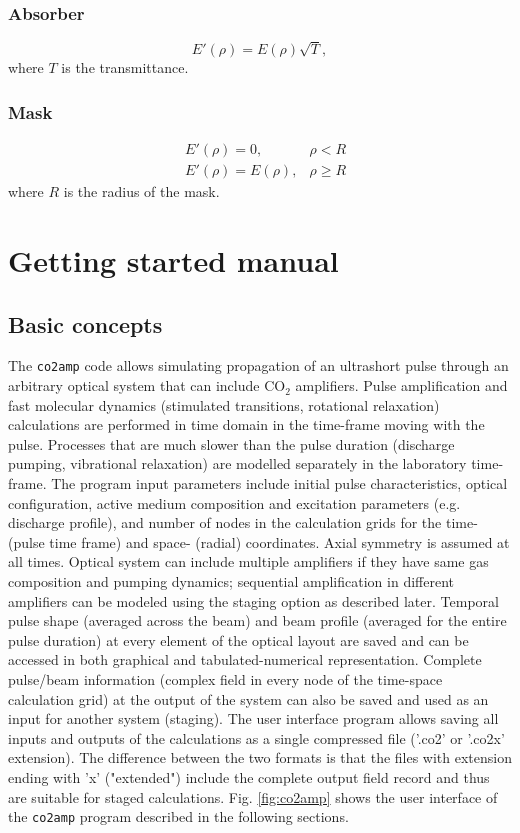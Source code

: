 \documentclass{report}
\begin{document}
\subsection{Absorber}
\begin{equation}
E'(\rho) = E(\rho) \sqrt{T},
\end{equation}
where $T$ is the transmittance.

\subsection{Mask}
\begin{align}
&E'(\rho) = 0, &\rho < R\\
&E'(\rho) = E(\rho), &\rho \geq R
\end{align}
where $R$ is the radius of the mask.


\chapter{Getting started manual}


\section{Basic concepts}
The \texttt{co2amp} code allows simulating propagation of an ultrashort pulse through an arbitrary optical system that can include CO$_2$ amplifiers. Pulse amplification and fast molecular dynamics (stimulated transitions, rotational relaxation) calculations are performed in time domain in the time-frame moving with the pulse. Processes that are much slower than the pulse duration (discharge pumping, vibrational relaxation) are modelled separately in the laboratory time-frame.
The program input parameters include initial pulse characteristics, optical configuration, active medium composition and excitation parameters (e.g. discharge profile), and number of nodes in the calculation grids for the time- (pulse time frame) and space- (radial) coordinates. Axial symmetry is assumed at all times. Optical system can include multiple amplifiers if they have same gas composition and pumping dynamics; sequential amplification in different amplifiers can be modeled using the staging option as described later.
Temporal pulse shape (averaged across the beam) and beam profile (averaged for the entire pulse duration) at every element of the optical layout are saved and can be accessed in both graphical and tabulated-numerical representation. Complete pulse/beam information (complex field in every node of the time-space calculation grid) at the output of the system can also be saved and used as an input for another system (staging).
The user interface program allows saving all inputs and outputs of the calculations as a single compressed file ('.co2' or '.co2x' extension). The difference between the two formats is that the files with extension ending with 'x' ("extended") include the complete output field record and thus are suitable for staged calculations.
Fig. \ref{fig:co2amp} shows the user interface of the \texttt{co2amp} program described in the following sections.
\end{document}
